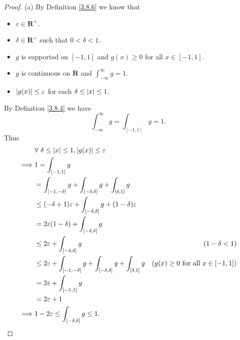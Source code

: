 \begin{proof}{(a)}
    By Definition \ref{3.8.6} we know that
    \begin{itemize}
        \item \(\varepsilon \in \mathbf{R}^+\).
        \item \(\delta \in \mathbf{R}^+\) such that \(0 < \delta < 1\).
        \item \(g\) is supported on \([-1, 1]\) and \(g(x) \geq 0\) for all \(x \in [-1, 1]\).
        \item \(g\) is continuous on \(\mathbf{R}\) and \(\int_{-\infty}^\infty g = 1\).
        \item \(\abs*{g(x)} \leq \varepsilon\) for each \(\delta \leq \abs*{x} \leq 1\).
    \end{itemize}
    By Definition \ref{3.8.4} we have
    \[
        \int_{-\infty}^\infty g = \int_{[-1, 1]} g = 1.
    \]
    Thus
    \begin{align*}
                 & \forall\ \delta \leq \abs*{x} \leq 1, \abs*{g(x)} \leq \varepsilon                                                                             \\
        \implies & 1 = \int_{[-1, 1]} g                                                                                                                           \\
                 & = \int_{[-1, -\delta]} g + \int_{[-\delta, \delta]} g + \int_{[\delta, 1]} g                                                                   \\
                 & \leq (-\delta + 1) \varepsilon + \int_{[-\delta, \delta]} g + (1 - \delta) \varepsilon                                                         \\
                 & = 2 \varepsilon (1 - \delta) + \int_{[-\delta, \delta]} g                                                                                      \\
                 & \leq 2 \varepsilon + \int_{[-\delta, \delta]} g                                                 & (1 - \delta < 1)                             \\
                 & \leq 2 \varepsilon + \int_{[-1, -\delta]} g + \int_{[-\delta, \delta]} g + \int_{[\delta, 1]} g & (g(x) \geq 0 \text{ for all } x \in [-1, 1]) \\
                 & = 2 \varepsilon + \int_{[-1, 1]} g                                                                                                             \\
                 & = 2 \varepsilon + 1                                                                                                                            \\
        \implies & 1 - 2 \varepsilon \leq \int_{[-\delta, \delta]} g \leq 1.
    \end{align*}
\end{proof}

